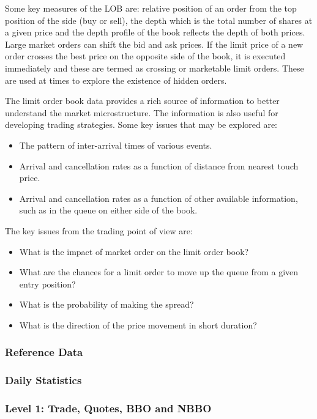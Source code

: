 Some key measures of the LOB are: relative position of an order from the top position of the side (buy or sell), the depth which is the total number of shares at a given price and the depth profile of the book reflects the depth of both prices. Large market orders can shift the bid and ask prices. If the limit price of a new order crosses the best price on the opposite side of the book, it is executed immediately and these are termed as crossing or marketable limit orders. These are used at times to explore the existence of hidden orders.


The limit order book data provides a rich source of information to better understand the market microstructure. The information is also useful for developing trading strategies. Some key issues that may be explored are:

\begin{itemize}
\item The pattern of inter-arrival times of various events.
\item Arrival and cancellation rates as a function of distance from nearest touch price.
\item Arrival and cancellation rates as a function of other available information, such as in the queue on either side of the book.
\end{itemize}

The key issues from the trading point of view are:

\begin{itemize}
\item What is the impact of market order on the limit order book?
\item What are the chances for a limit order to move up the queue from a given entry position?
\item What is the probability of making the spread?
\item What is the direction of the price movement in short duration?
\end{itemize}
\subsubsection{Reference Data}
\subsubsection{Daily Statistics}
\subsubsection{Level 1: Trade, Quotes, BBO and NBBO}

